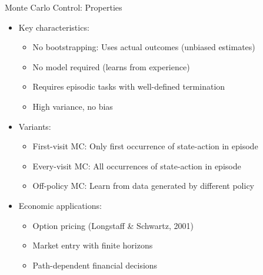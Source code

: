 \documentclass[10pt]{beamer}
\begin{document}
\begin{frame}{Monte Carlo Control: Properties}
    \begin{itemize}
        \item Key characteristics:
        \begin{itemize}
            \item No bootstrapping: Uses actual outcomes (unbiased estimates)
            \item No model required (learns from experience)
            \item Requires episodic tasks with well-defined termination
            \item High variance, no bias
        \end{itemize}
        \vspace{0.2cm}
        \item Variants:
        \begin{itemize}
            \item First-visit MC: Only first occurrence of state-action in episode
            \item Every-visit MC: All occurrences of state-action in episode
            \item Off-policy MC: Learn from data generated by different policy
        \end{itemize}
        \vspace{0.2cm}
        \item Economic applications:
        \begin{itemize}
            \item Option pricing (Longstaff \& Schwartz, 2001)
            \item Market entry with finite horizons
            \item Path-dependent financial decisions
        \end{itemize}
    \end{itemize}
\end{frame}

\end{document}
